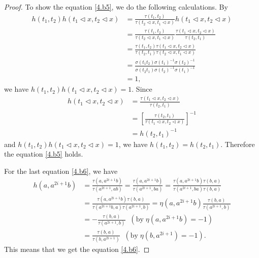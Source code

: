 \documentclass[a4paper,11pt]{amsart}
\numberwithin{equation}{section}
\begin{document}
\begin{proof}
To show the equation \eqref{4.b5}, we do the following calculations. By
\begin{align*}
h(t_1,t_2)h(t_1\triangleleft x, t_2\triangleleft x)&=\frac{\tau(t_1,t_2)}{\tau(t_2 \triangleleft x,t_1\triangleleft x)} h(t_1\triangleleft x, t_2\triangleleft x)\\
&=\frac{\tau(t_1,t_2)}{\tau(t_2 \triangleleft x,t_1\triangleleft x)} \frac{\tau(t_1 \triangleleft x,t_2\triangleleft x)}{\tau(t_2,t_1)}\\
&=\frac{\tau(t_1,t_2) \tau(t_1 \triangleleft x,t_2\triangleleft x)}{\tau(t_2,t_1) \tau(t_2 \triangleleft x,t_1\triangleleft x)}\\
&=\frac{\sigma(t_1t_2) \sigma(t_1)^{-1} \sigma(t_2)^{-1}}{\sigma(t_2t_1) \sigma(t_2)^{-1} \sigma(t_1)^{-1}}\\
&=1,
\end{align*}
we have $h(t_1,t_2)h(t_1\triangleleft x, t_2\triangleleft x)=1$. Since
\begin{align*}
h(t_1\triangleleft x, t_2\triangleleft x)&=\frac{\tau(t_1 \triangleleft x,t_2\triangleleft x)}{\tau(t_2,t_1)}\\
&=[\frac{\tau(t_2,t_1)}{\tau(t_1 \triangleleft x,t_2\triangleleft x)}]^{-1}\\
&=h(t_2,t_1)^{-1}
\end{align*}
and $h(t_1,t_2)h(t_1\triangleleft x, t_2\triangleleft x)=1$, we have $h(t_1,t_2)=h(t_2,t_1)$. Therefore the equation \eqref{4.b5} holds.

For the last equation \eqref{4.b6}, we have
\begin{align*}
h(a,a^{2i+1}b)&=\frac{\tau(a,a^{2i+1}b)}{\tau(a^{2i+1},ab)}
=\frac{\tau(a,a^{2i+1}b)}{\tau(a^{2i+1},ba)}=\frac{\tau(a,a^{2i+1}b) \tau(b,a)}{\tau(a^{2i+1},ba) \tau(b,a)}\\
&=\frac{\tau(a,a^{2i+1}b) \tau(b,a)}{\tau(a^{2i+1}b,a) \tau(a^{2i+1},b)}=\eta(a,a^{2i+1}b) \frac{\tau(b,a)}{\tau(a^{2i+1},b)} \\
&=-\frac{\tau(b,a)}{\tau(a^{2i+1},b)}\;\; (\text{by}\; \eta(a,a^{2i+1}b)=-1)\\
&=\frac{\tau(b,a)}{\tau(b,a^{2i+1})} \;\; (\text{by}\; \eta(b,a^{2i+1})=-1).
\end{align*}
This means that we get the equation \eqref{4.b6}.


\end{proof}
\end{document}
